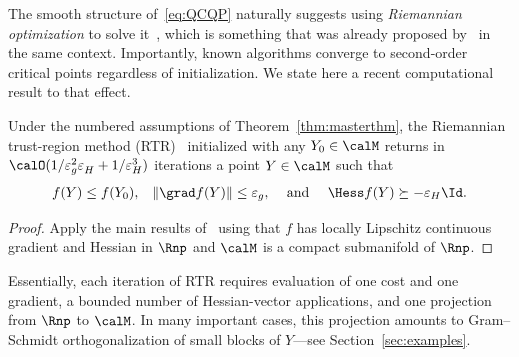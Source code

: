 \documentclass{article}
\newcommand{\1}{\mathbf{1}}
\begin{document}
The smooth structure of~\eqref{eq:QCQP} naturally suggests using \emph{Riemannian optimization} to solve it~\citep{AMS08}, which is something that was already proposed by~\citet{journee2010low} in the same context.
Importantly, known algorithms
converge to second-order critical points regardless of initialization.
We state here a recent computational result to that effect.
\begin{proposition}\label{prop:complexity}
	Under the numbered assumptions of Theorem~\ref{thm:masterthm}, the Riemannian trust-region method (RTR)~\citep{genrtr} initialized with any $Y_0\in\calM$ returns in $\calO(1/\varepsilon_g^2\varepsilon_H^{} + 1/\varepsilon_H^3)$ iterations a point $Y\in\calM$ such that
	\begin{align*}
		f(Y) & \leq f(Y_0), & \|\grad f(Y)\| & \leq \varepsilon_g, & \textrm{ and } & & \Hess f(Y) \succeq -\varepsilon_H \Id.
	\end{align*}
\end{proposition}
\begin{proof}
	Apply the main results of~\citep{boumal2016globalrates} using that $f$ has locally Lipschitz continuous gradient and Hessian in $\Rnp$ and $\calM$ is a compact submanifold of $\Rnp$.
\end{proof}
Essentially, each iteration of RTR requires evaluation of one cost and one gradient, a bounded number of Hessian-vector applications, and one projection from $\Rnp$ to $\calM$. In many important cases, this projection amounts to Gram--Schmidt orthogonalization of small blocks of $Y$---see Section~\ref{sec:examples}. %
\end{document}
